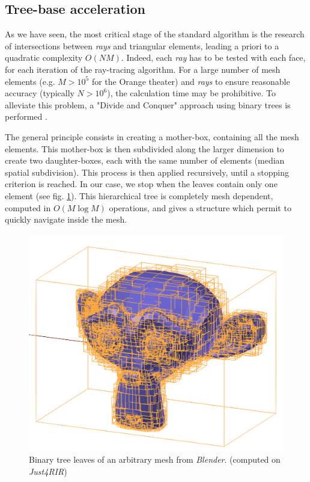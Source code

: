 \documentclass[AMA,STIX1COL]{WileyNJD-v2}
\begin{document}
\subsection{Tree-base acceleration}
\label{octree}
As we have seen, the most critical stage of the standard algorithm is the research of intersections between  \textit{rays} and triangular elements, leading a priori to a quadratic complexity $O(N M)$. Indeed, each \textit{ray} has to be tested with each face, for each iteration of the ray-tracing algorithm. For a large number of mesh elements (e.g. $M>10^5$ for the Orange theater) and \textit{rays} to ensure reasonable accuracy (typically $N>10^6$), the calculation time may be prohibitive. To alleviate this problem, a "Divide and Conquer" approach using binary trees is performed \cite{fft} \cite{matrix}. 

The general principle consists in creating a mother-box, containing all the mesh elements. This mother-box is then subdivided along the larger dimension to create two daughter-boxes, each with the same number of elements (median spatial subdivision). This process is then applied recursively, until a stopping criterion is reached. In our case, we stop when the leaves contain only one element (see fig. \ref{octreeSuzanne}). This hierarchical tree is completely mesh dependent, computed in $O(M\log M)$ operations, and gives a structure which permit to quickly navigate inside the mesh. %

\begin{figure}[t]
\centering
		\includegraphics[width=0.4\linewidth]{octreeSuzanne}
		\caption{Binary tree leaves of an arbitrary mesh from \textit{Blender}. (computed on \textit{Just4RIR})}
		\label{octreeSuzanne}
\end{figure}
\end{document}
